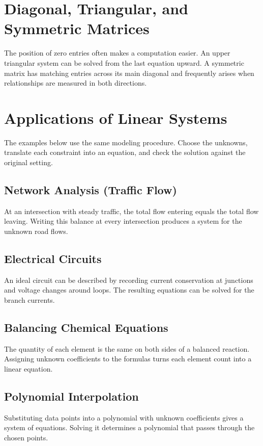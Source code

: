 \documentclass[11pt,letterpaper,oneside,openany]{textbookchapter}
\begin{document}
\section{Diagonal, Triangular, and Symmetric Matrices}
The position of zero entries often makes a computation easier. An upper
triangular system can be solved from the last equation upward. A symmetric
matrix has matching entries across its main diagonal and frequently arises
when relationships are measured in both directions.

\section{Applications of Linear Systems}
The examples below use the same modeling procedure. Choose the unknowns,
translate each constraint into an equation, and check the solution against
the original setting.

\subsection{Network Analysis (Traffic Flow)}
At an intersection with steady traffic, the total flow entering equals the
total flow leaving. Writing this balance at every intersection produces a
system for the unknown road flows.

\subsection{Electrical Circuits}
An ideal circuit can be described by recording current conservation at
junctions and voltage changes around loops. The resulting equations can be
solved for the branch currents.

\subsection{Balancing Chemical Equations}
The quantity of each element is the same on both sides of a balanced
reaction. Assigning unknown coefficients to the formulas turns each element
count into a linear equation.

\subsection{Polynomial Interpolation}
Substituting data points into a polynomial with unknown coefficients gives a
system of equations. Solving it determines a polynomial that passes through
the chosen points.
\end{document}

